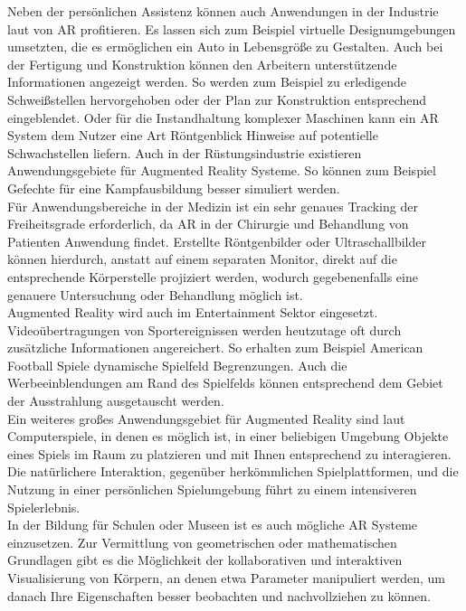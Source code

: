 Neben der persönlichen Assistenz können auch Anwendungen in der Industrie laut \citet{van2010survey} von AR profitieren. Es lassen sich zum Beispiel virtuelle Designumgebungen umsetzten, die es ermöglichen ein Auto in Lebensgröße zu Gestalten. Auch bei der Fertigung und Konstruktion können den Arbeitern unterstützende Informationen angezeigt werden. So werden zum Beispiel zu erledigende Schweißstellen hervorgehoben oder der Plan zur Konstruktion entsprechend eingeblendet. Oder für die Instandhaltung komplexer Maschinen kann ein AR System dem Nutzer eine Art Röntgenblick Hinweise auf potentielle Schwachstellen liefern. Auch in der Rüstungsindustrie existieren Anwendungsgebiete für Augmented Reality Systeme. So können zum Beispiel Gefechte für eine Kampfausbildung besser simuliert werden. \citep{azuma2001recent} \\

Für Anwendungsbereiche in der Medizin ist ein sehr genaues Tracking der Freiheitsgrade erforderlich, da AR in der Chirurgie und Behandlung von Patienten Anwendung findet. Erstellte Röntgenbilder oder Ultraschallbilder können hierdurch, anstatt auf einem separaten Monitor, direkt auf die entsprechende Körperstelle projiziert werden, wodurch gegebenenfalls eine genauere Untersuchung oder Behandlung möglich ist. \citep{van2010survey} \\

Augmented Reality wird auch im Entertainment Sektor eingesetzt. Videoübertragungen von Sportereignissen werden heutzutage oft durch zusätzliche Informationen angereichert. So erhalten zum Beispiel American Football Spiele dynamische Spielfeld Begrenzungen. Auch die Werbeeinblendungen am Rand des Spielfelds können entsprechend dem Gebiet der Ausstrahlung ausgetauscht werden. \citep{azuma2001recent} \\

Ein weiteres großes Anwendungsgebiet für Augmented Reality sind laut \citet{azuma2001recent} Computerspiele, in denen es möglich ist, in einer beliebigen Umgebung Objekte eines Spiels im Raum zu platzieren und mit Ihnen entsprechend zu interagieren. Die natürlichere Interaktion, gegenüber herkömmlichen Spielplattformen, und die Nutzung in einer persönlichen Spielumgebung führt zu einem intensiveren Spielerlebnis. \\

In der Bildung für Schulen oder Museen ist es auch mögliche AR Systeme einzusetzen. Zur Vermittlung von geometrischen oder mathematischen Grundlagen gibt es die Möglichkeit der kollaborativen und interaktiven Visualisierung von Körpern, an denen etwa Parameter manipuliert werden, um danach Ihre Eigenschaften besser beobachten und nachvollziehen zu können. \citep{van2010survey} \\

